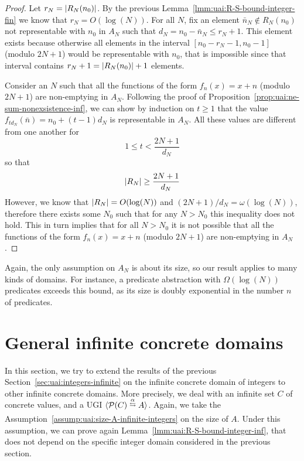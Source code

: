 \begin{proof}
	Let $r_N = \lvert R_N(n_0)\rvert$. By the previous Lemma~\ref{lmm:uai:R-S-bound-integer-fin} we know that $r_N = O(\log(N))$. For all $N$, fix an element $\bar{n}_N \notin R_N(n_0)$ not representable with $n_0$ in $A_N$ such that $d_N = n_0 - \bar{n}_N \le r_N + 1$.
	This element exists because otherwise all elements in the interval $[n_0 - r_N - 1, n_0 - 1]$ (modulo $2N + 1$) would be representable with $n_0$, that is impossible since that interval contains $r_N + 1 = \lvert R_N(n_0)\rvert + 1$ elements.

	Consider an $N$ such that all the functions of the form $f_n(x) = x + n$ (modulo $2N + 1$) are non-emptying in $A_N$.
	Following the proof of Proposition~\ref{prop:uai:ne-sum-nonexsistence-inf}, we can show by induction on $t \ge 1$ that the value $f_{t d_N}(\bar{n}) = n_0 + (t - 1) d_N$ is representable in $A_N$. All these values are different from one another for
	\begin{equation*}
		1 \le t < \frac{2N + 1}{d_N}
	\end{equation*}
	so that
	\begin{equation*}
		\lvert R_N\rvert \ge \frac{2N + 1}{d_N}
	\end{equation*}
	However, we know that $\lvert R_N\rvert = O(\log(N))$ and $(2N + 1) / d_N = \omega(\log(N))$, therefore there exists some $N_0$ such that for any $N > N_0$ this inequality does not hold. This in turn implies that for all $N > N_0$ it is not possible that all the functions of the form $f_n(x) = x + n$ (modulo $2N + 1$) are non-emptying in $A_N$.
\end{proof}

Again, the only assumption on $A_N$ is about its size, so our result applies to many kinds of domains. For instance, a predicate abstraction \cite{GS97} with $\Omega(\log(N))$ predicates exceeds this bound, as its size is doubly exponential in the number $n$ of predicates.

\section{General infinite concrete domains}\label{sec:uai:infinite}
In this section, we try to extend the results of the previous Section~\ref{sec:uai:integers-infinite} on the infinite concrete domain of integers to other infinite concrete domains. More precisely, we deal with an infinite set $C$ of concrete values, and a UGI $\ugi{\pow(C)}{\alpha}{A}$.
Again, we take the Assumption~\ref{assump:uai:size-A-infinite-integers} on the size of $A$.
Under this assumption, we can prove again Lemma~\ref{lmm:uai:R-S-bound-integer-inf}, that does not depend on the specific integer domain considered in the previous section.

